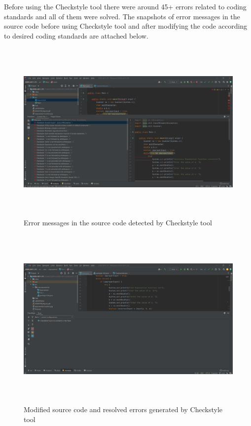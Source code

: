 \documentclass[12pt, a4paper]{article}
\begin{document}
\noindent
Before using the Checkstyle tool there were around 45+ errors related to coding standards  and all of them were solved. The snapshots of error messages in the source code before using Checkstyle tool and after modifying the code according to desired coding standards are attached below. 


\newpage

\begin{figure}[h]
	\includegraphics[width=15cm,height=9cm]{CheckStyle(Before).png}
	\caption{Error messages in the source code detected by Checkstyle tool}
	\label{fig:Debugging computation of exponential function}
\end{figure}


\begin{figure}[h!]
	\includegraphics[width=15cm,height=9cm]{CheckStyle(After).png}
	\caption{Modified source code and resolved errors generated by Checkstyle tool}
	\label{Debugging computation of fractional exponent value}
\end{figure}
\end{document}
